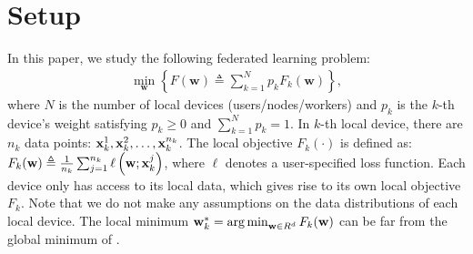 

\section{Setup}


In this paper, we study the following federated learning problem:
\begin{align}
	\min _{\mathbf{w}}\left\{F(\mathbf{w}) \triangleq \sum\nolimits_{k=1}^{N} p_{k} F_{k}(\mathbf{w})\right\},
	\label{eq:problem}
\end{align}
where $N$ is the number of local devices (users/nodes/workers) and $p_k$ is the $k$-th device's weight satisfying $p_k \geq 0$ and $\sum_{k=1}^N p_k = 1$. 
In $k$-th local device, there are $n_k$ data points:
${\mathbf{x}}_k^1, {\mathbf{x}}_k^2, \dots, {\mathbf{x}}_k^{n_k}$.  
The local objective $F_k(\cdot)$ is defined as:
$F_{k}(\mathbf{w}) \triangleq \frac{1}{n_{k}} \sum_{j=1}^{n_{k}} \ell\left(\mathbf{w} ; {\mathbf{x}}_k^j\right)$,
where $\ell$ denotes a user-specified loss function. Each device only has access to its local data, which gives rise to its own local objective $F_k$. Note that we do not make any assumptions on the
data distributions of each local device. The local minimum
${\mathbf{w}}^{*}_k= \operatorname*{arg\,min}_{{\mathbf{w}} \in R^d} F_k({\mathbf{w}})$ can be far from
the global minimum of \eq{\ref{eq:problem}}.



